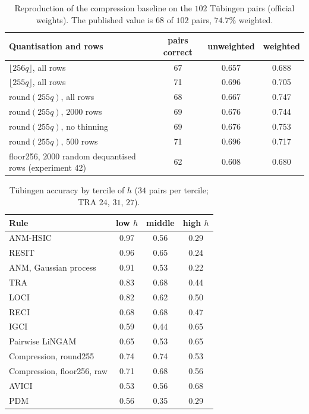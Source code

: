 \begin{table}[ht]
\caption{Reproduction of the compression baseline on the $102$ T\"ubingen pairs (official weights). The published value is $68$ of $102$ pairs, $74.7\%$ weighted.}
\label{tab:audit}
\small
\begin{tabular}{@{}lccc@{}}
\toprule
Quantisation and rows & pairs correct & unweighted & weighted\\
\midrule
$\lfloor 256q\rfloor$, all rows & 67 & 0.657 & 0.688\\
$\lfloor 255q\rfloor$, all rows & 71 & 0.696 & 0.705\\
$\mathrm{round}(255q)$, all rows & 68 & 0.667 & 0.747\\
$\mathrm{round}(255q)$, $2000$ rows & 69 & 0.676 & 0.744\\
$\mathrm{round}(255q)$, no thinning & 69 & 0.676 & 0.753\\
$\mathrm{round}(255q)$, $500$ rows & 71 & 0.696 & 0.717\\
floor256, $2000$ random dequantised rows (experiment 42) & 62 & 0.608 & 0.680\\
\bottomrule
\end{tabular}
\end{table}

\begin{table}[ht]
\caption{T\"ubingen accuracy by tercile of $h$ ($34$ pairs per tercile; TRA $24$, $31$, $27$).}
\label{tab:strata}
\small
\begin{tabular}{@{}lccc@{}}
\toprule
Rule & low $h$ & middle & high $h$\\
\midrule
ANM-HSIC & 0.97 & 0.56 & 0.29\\
RESIT & 0.96 & 0.65 & 0.24\\
ANM, Gaussian process & 0.91 & 0.53 & 0.22\\
TRA & 0.83 & 0.68 & 0.44\\
LOCI & 0.82 & 0.62 & 0.50\\
RECI & 0.68 & 0.68 & 0.47\\
IGCI & 0.59 & 0.44 & 0.65\\
Pairwise LiNGAM & 0.65 & 0.53 & 0.65\\
Compression, round255 & 0.74 & 0.74 & 0.53\\
Compression, floor256, raw & 0.71 & 0.68 & 0.56\\
AVICI & 0.53 & 0.56 & 0.68\\
PDM & 0.56 & 0.35 & 0.29\\
\bottomrule
\end{tabular}
\end{table}

